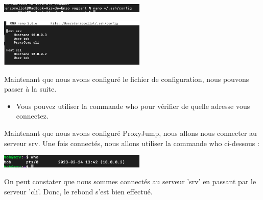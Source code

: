 \documentclass[12pt]{article}
\begin{document}
\vspace{0.3cm}

\begin{center}
  \includegraphics[width=7cm]{Images-Client-SSH/Image-TD-SSH-8/nano-config.png}
\end{center}

\vspace{0.3cm}

\begin{center}
  \includegraphics[width=7cm]{Images-Client-SSH/Image-TD-SSH-8/ProxyJump.png}
\end{center}

\vspace{0.3cm}

Maintenant que nous avons configuré le fichier de configuration, nous pouvons passer à la suite.

\vspace{0.3cm}

\begin{itemize}
  \item Vous pouvez utiliser la commande who pour vérifier de quelle adresse vous connectez.
\end{itemize}

\vspace{0.3cm}

Maintenant que nous avons configuré ProxyJump, nous allons nous connecter au serveur srv. Une fois connectés, nous allons utiliser la commande who ci-dessous :

\vspace{0.3cm}

\begin{center}
  \includegraphics[width=7cm]{Images-Client-SSH/Image-TD-SSH-8/commande-who.png}
\end{center}

\vspace{0.3cm}

On peut constater que nous sommes connectés au serveur 'srv' en passant par le serveur 'cli'. Donc, le rebond s'est bien effectué.
\end{document}
